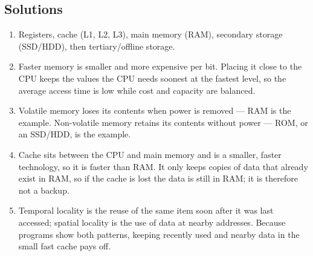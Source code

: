\documentclass[11pt]{article}
\begin{document}
\subsection*{Solutions}
\begingroup\small
\begin{enumerate}[label=\arabic*.]
  \item Registers, cache (L1, L2, L3), main memory (RAM), secondary storage
    (SSD/HDD), then tertiary/offline storage.
  \item Faster memory is smaller and more expensive per bit. Placing it close
    to the CPU keeps the values the CPU needs soonest at the fastest level,
    so the average access time is low while cost and capacity are balanced.
  \item Volatile memory loses its contents when power is removed --- RAM is
    the example. Non-volatile memory retains its contents without power ---
    ROM, or an SSD/HDD, is the example.
  \item Cache sits between the CPU and main memory and is a smaller, faster
    technology, so it is faster than RAM. It only keeps copies of data that
    already exist in RAM, so if the cache is lost the data is still in RAM;
    it is therefore not a backup.
  \item Temporal locality is the reuse of the same item soon after it was
    last accessed; spatial locality is the use of data at nearby addresses.
    Because programs show both patterns, keeping recently used and nearby
    data in the small fast cache pays off.
\end{enumerate}
\endgroup
\end{document}
